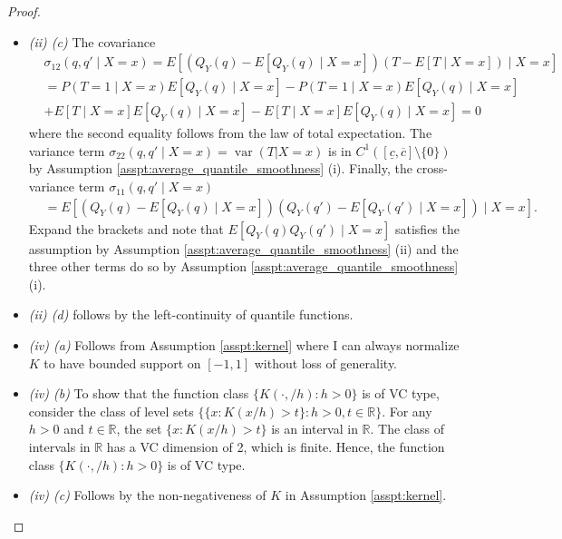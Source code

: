 \documentclass[12pt]{article}
\newcommand{\var}{\operatorname{var}}
\begin{document}
\begin{proof}
\begin{itemize}
\begin{align*}
    & \int_{[\underline{c}, \overline{c}] \times \mathcal{Y}}\left(F_{\mathcal{E}}(x,y)\right)^{2+\varepsilon} \mathrm{d} P^x(y, x) \\
    & \leq 2^{1+\varepsilon} \int_{[\underline{c}, \bar{c}] \times \mathcal{Y}}\left(F_1(y, x)^{2+\varepsilon}+F_2(y, x)^{2+\varepsilon}\right) \mathrm{d} P^x(y, x) < \infty. 
\end{align*}
\item \textit{(ii) (c)} The covariance 
\begin{align*} 
& \sigma_{12}(q,q' \mid X=x)  = E[(Q_Y(q) - E[Q_Y(q) \mid X=x]) ( T - E[T \mid X=x]) \mid X=x]  \\
& = P(T=1 \mid X=x) E[Q_Y(q) \mid X=x] - P(T=1 \mid X=x) E[Q_Y(q) \mid X=x] \\
& + E[T \mid X=x] E[Q_Y(q) \mid X=x] - E[T \mid X=x] E[Q_Y(q) \mid X=x] = 0
\end{align*}
where the second equality follows from the law of total expectation. The variance term $\sigma_{22}(q,q' \mid X=x)=\var(T | X=x)$ is in $C^1([\underline{c}, \overline{c}] \setminus \{0 \} )$ by Assumption \ref{asspt:average_quantile_smoothness} (i). Finally, the cross-variance term $\sigma_{11}(q,q' \mid X=x)$ \begin{align*} 
& =E[(Q_Y(q) - E[Q_Y(q) \mid X=x]) (Q_Y(q') - E[Q_Y(q') \mid X=x]) \mid X=x].
\end{align*}
Expand the brackets and note that $E[Q_Y(q) Q_Y(q') \mid X=x]$ satisfies the assumption by Assumption \ref{asspt:average_quantile_smoothness} (ii) and the three other terms do so by Assumption \ref{asspt:average_quantile_smoothness} (i). 
\item \textit{(ii) (d)} follows by the left-continuity of quantile functions. 
\item \textit{(iv) (a)} Follows from Assumption \ref{asspt:kernel} where I can always normalize $K$ to have bounded support on $[-1,1]$ without loss of generality. 
\item \textit{(iv) (b)} To show that the function class $\{K(\cdot, / h): h>0\}$ is of VC type, consider the class of level sets $\{\{x: K(x / h)>t\}: h>0, t \in \mathbb{R}\}$.
For any $h>0$ and $t \in \mathbb{R}$, the set $\{x: K(x / h)>t\}$ is an interval in $\mathbb{R}$.
The class of intervals in $\mathbb{R}$ has a VC dimension of 2, which is finite. Hence, the function class $\{K(\cdot, / h): h>0\}$ is of VC type. 
\item \textit{(iv) (c)} Follows by the non-negativeness of $K$ in Assumption \ref{asspt:kernel}.
\end{itemize}

\end{proof}
\end{document}
